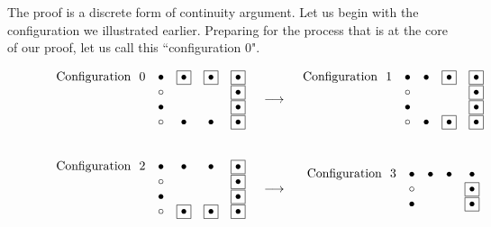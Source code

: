 \documentclass{article}
\begin{document}
The proof is a discrete form of continuity argument.  Let us begin with the configuration we illustrated earlier.  Preparing for the process that is at the core of our proof, let us call this ``configuration $0$".

\begin{figure}[htb]
\[
\begin{array}{ccc}
\begin{array}{rcccc}
\mbox{Configuration } \ 0 &
\bullet & \fbox{$\bullet$} & \fbox{$\bullet$} & \fbox{$\bullet$}  \\
& \circ   &                      &                      & \fbox{$\bullet$}  \\
& \bullet &                      &                      & \fbox{$\bullet$}  \\
& \circ    &  \bullet          &   \bullet         & \fbox{$\bullet$}
\end{array}
 & \longrightarrow &
\begin{array}{rcccc}
\mbox{Configuration } \ 1 &
\bullet & \bullet          & \fbox{$\bullet$} & \fbox{$\bullet$}  \\
& \circ   &                      &                      & \fbox{$\bullet$}  \\
& \bullet &                      &                      & \fbox{$\bullet$}  \\
& \circ    &  \bullet           & \fbox{$\bullet$} & \fbox{$\bullet$}
\end{array}
 \\  \\ \\
\begin{array}{rcccc}
\mbox{Configuration } \ 2 &
\bullet & \bullet          &      \bullet     & \fbox{$\bullet$} \\
& \circ   &                      &                      & \fbox{$\bullet$}  \\
& \bullet &                      &                      & \fbox{$\bullet$}  \\
& \circ   & \fbox{$\bullet$} & \fbox{$\bullet$} & \fbox{$\bullet$}
\end{array}
 & \longrightarrow &
\begin{array}{rcccc}
\mbox{Configuration } \  3 &
\bullet & \bullet                 &            \bullet & \bullet  \\
& \circ    &                            &                      & \fbox{$\bullet$}  \\
& \bullet &                            &                      & \fbox{$\bullet$}  \\

\end{array}
\end{array}\]
\end{figure}
\end{document}
